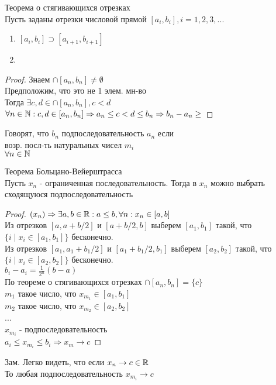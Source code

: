 
\begin{theorem}
	Теорема о стягивающихся отрезках \\
	Пусть заданы отрезки числовой прямой $ [a_i, b_i], i = 1, 2, 3,...$ \\
	\begin{enumerate}
		\item $ [a_i, b_i] \supset [a_{i+1}, b_{i+1}] $ 
		\item 
	\end{enumerate}
	\begin{proof}
		Знаем $ \cap [a_n, b_n] \neq \emptyset $ \\
		Предположим, что это не 1 элем. мн-во \\
		Тогда $ \exists c, d \in  \cap [a_n, b_n], c < d $ \\
		$ \forall n \in \mathbb{N} : c, d \in  [a_n, b_n] \Rightarrow a_n \leq c < d \leq b_n  \Rightarrow b_n - a_n \geq $
	\end{proof}
\end{theorem}
\begin{definition}
	Говорят, что $ b_n $ подпоследовательность $ a_n $ если \\
	возр. посл-ть натуральных чисел $ m_i $ \\
	$ \forall n \in \mathbb{N}$
	
\end{definition}
\begin{theorem}
	Теорема Больцано-Вейерштрасса \\

	Пусть $ x_n$ - ограниченная последовательность. Тогда в $ x_n $ можно выбрать сходящуюся подпоследовательность
	\begin{proof}
	$ (x_n) \Rightarrow \exists a, b \in \mathbb{R} : a \leq b, \forall n : x_n \in [a, b] $ \\
	Из отрезков $ [a, a+b / 2] $ и $ [a+b/2, b] $ выберем $ [a_1, b_1] $ такой, что $ \{i \mid x_i \in [a_1, b_1]\} $ бесконечно. \\
 	Из отрезков $ [a_1, a_1+b_1 / 2] $ и $ [a_1+b_1/2, b_1] $ выберем $ [a_2, b_2] $ такой, что $ \{i \mid x_i \in [a_2, b_2]\} $ бесконечно. \\
    $ b_i - a_i = \frac{1}{2^n} (b-a) $ \\
    По теореме о стягивающихся отрезках 
    $ \cap [a_n, b_n] = \{c\}$ \\
    $ m_1 $ такое число, что $ x_{m_1} \in [a_1, b_1] $ \\
    $ m_2 $ такое число, что $ x_{m_2} \in [a_2, b_2] $ \\
    ...\\
    $ x_{m_i} $ - подпоследовательность \\
    $ a_i \leq x_{m_i} \leq b_i  \Rightarrow x_m \rightarrow c$ 
    \end{proof}
	Зам. Легко видеть, что  если $ x_n \rightarrow c \in \mathbb{R} $ \\
	То любая подпоследовательность $ x_{m_i} \rightarrow c $ \\
\end{theorem}
